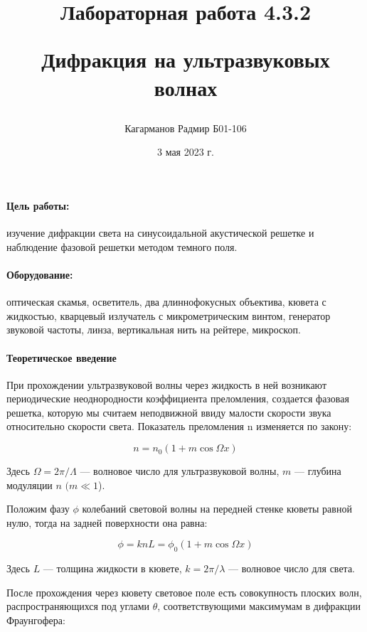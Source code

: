\documentclass[a4paper,12pt]{article}
\title{Лабораторная работа 4.3.2

Дифракция на ультразвуковых волнах}
\author{Кагарманов Радмир Б01-106}
\date{3 мая 2023 г.}
\begin{document}
\maketitle
\thispagestyle{empty}
\newpage
\setcounter{page}{1}

\paragraph{Цель работы:} изучение дифракции света на синусоидальной акустической решетке и
	наблюдение фазовой решетки методом темного поля.
	
	\paragraph{Оборудование:} оптическая скамья, осветитель, два длиннофокусных объектива, кювета с жидкостью, кварцевый излучатель с микрометрическим винтом, генератор звуковой частоты, линза, вертикальная нить на рейтере, микроскоп.
	
 \paragraph{Теоретическое введение\\}

	
	При прохождении ультразвуковой волны через жидкость в ней возникают периодические неоднородности коэффициента преломления, создается фазовая решетка, которую мы считаем неподвижной ввиду малости скорости звука относительно скорости света. Показатель
	преломления n изменяется по закону:
	
	\begin{equation}\label{}
	n = n_0 (1 + m \cos \Omega x)
	\end{equation}
	
	Здесь $ \Omega = 2 \pi / \Lambda $ --- волновое число для ультразвуковой волны, $ m $ --- глубина модуляции $ n $ $ (m \ll 1 $).
	
	Положим фазу $ \phi $ колебаний световой волны на передней стенке кюветы равной нулю, тогда на задней поверхности она равна:
	
	\begin{equation}\label{}
	\phi  = k n L = \phi_0 (1 + m \cos \Omega x)
	\end{equation}
	
	Здесь $ L $ --- толщина жидкости в кювете, $ k = 2 \pi / \lambda $ --- волновое число для света.
	
	После прохождения через кювету световое поле есть совокупность плоских волн, распространяющихся под углами $ \theta $, соответствующими максимумам в дифракции Фраунгофера:
	
\end{document}
